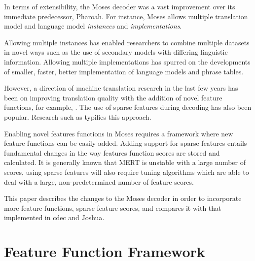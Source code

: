 \documentclass{pbml}
\begin{document}

In terms of extensibility, the Moses\cite{koehn-EtAl:2007:PosterDemo} decoder was a vast improvement over its immediate predecessor, Pharoah\cite{Koehn:Pharaoh:2004}. For instance, Moses allows multiple translation model and language model \emph{instances} and \emph{implementations}. 

Allowing multiple instances has enabled researchers to combine multiple datasets in novel ways such as the use of secondary models with differing linguistic information\cite{Koehn:Philipp:2007, Sennrich:Rico:2011,Koehn:Philipp:2012}. Allowing multiple implementations has spurred on the developments of smaller, faster, better implementation of language models and phrase tables\cite{talbot-osborne:2007:ACLMain, Heafield-kenlm, Junczys-Dowmunt:Marcin:2012}.

However, a direction of machine translation research in the last few years has been on improving translation quality with the addition of novel feature functions, for example, \cite{Gimpel:2008:RSC:1626394.1626396}. The use of sparse features during decoding has also been popular. Research such as \cite{chiang-knight-wang:2009:NAACLHLT09, cherry:2013:NAACL-HLT} typifies this approach.

Enabling novel features functions in Moses requires a framework where new feature functions can be easily added. Adding support for sparse features entails fundamental changes in the way features function scores are stored and calculated. It is generally known that MERT\cite{Och:MERT} is unstable with a large number of scores, using sparse features will also require tuning algorithms which are able to deal with a large, non-predetermined number of feature scores. 

This paper describes the changes to the Moses decoder in order to incorporate more feature functions, sparse feature scores, and compares it with that implemented in cdec\cite{Dyer_etal_2010} and Joshua\cite{Joshua-Decoder}.

\section{Feature Function Framework}
\end{document}
